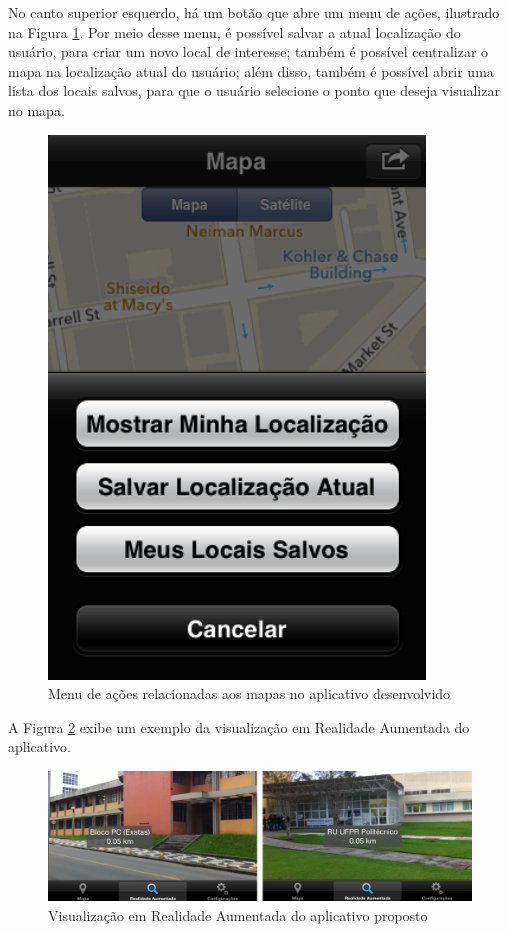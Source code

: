 No canto superior esquerdo, há um botão que abre um menu de ações, ilustrado na 
Figura \ref{fig:maps-action-menu}. Por meio desse menu, é possível salvar a
atual localização do usuário, para criar um novo local de interesse; também é
possível centralizar o mapa na localização atual do usuário; além disso, também
é possível abrir uma lista dos locais salvos, para que o usuário selecione o ponto
que deseja visualizar no mapa.

\begin{figure}[h!]
    \centering
    \caption{Menu de ações relacionadas aos mapas no aplicativo desenvolvido}
    \label{fig:maps-action-menu}
    \includegraphics[width=10cm]{resources/App_Maps_Screenshots/action-menu.png}
\end{figure}



A Figura \ref{fig:App-AR-Screenshot} exibe um exemplo da visualização em Realidade Aumentada
do aplicativo.

\begin{figure}[h!]
    \centering
    \caption{Visualização em Realidade Aumentada do aplicativo proposto}
    \label{fig:App-AR-Screenshot}
    \includegraphics[width=17cm]{resources/App_AR_Screenshots/AR-sceenshot.png}
\end{figure}



